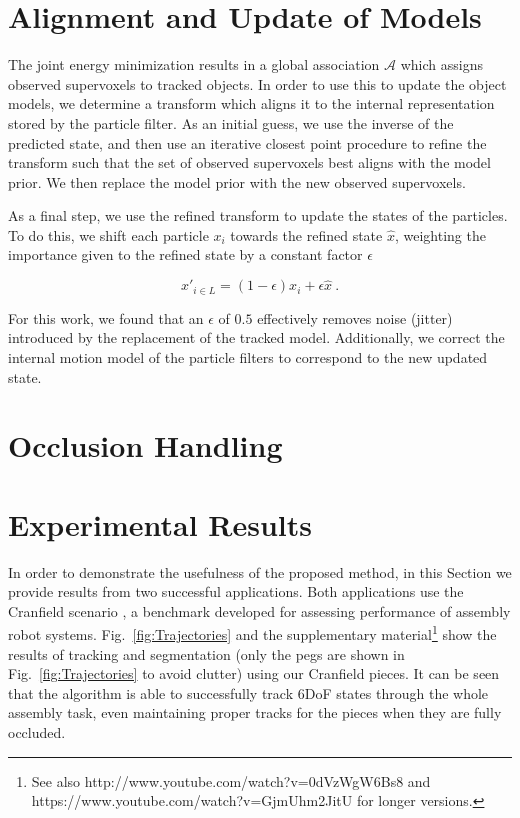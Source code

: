 \section{Alignment and Update of Models}
The joint energy minimization results in a global association $\mathcal{A}$ which assigns observed supervoxels to tracked objects. In order to use this to update the object models, we determine a transform which aligns it to the internal representation stored by the particle filter. As an initial guess, we use the inverse of the predicted state, and then use an iterative closest point \cite{ICPChetverikov} procedure to refine the transform such that the set of observed supervoxels best aligns with the model prior. We then replace the model prior with the new observed supervoxels. 

As a final step, we use the refined transform to update the states of the particles. To do this, we shift each particle $x_i$ towards the refined state $\hat{x}$, weighting the importance given to the refined state by a constant factor $\epsilon$

\begin{equation}
\label{eqn:PFUpdate}
x'_{i \in L} = (1-\epsilon) x_i + \epsilon \hat{x}~.
\end{equation}

For this work, we found that an $\epsilon$ of $0.5$ effectively removes noise (jitter) introduced by the replacement of the tracked model. Additionally, we correct the internal motion model of the particle filters to correspond to the new updated state.

\section{Occlusion Handling}
\section{Experimental Results}
In order to demonstrate the usefulness of the proposed method, in this Section we provide results from two successful applications. Both applications use the Cranfield scenario \cite{collins1984development}, a benchmark developed for assessing performance of assembly robot systems. Fig.~\ref{fig:Trajectories} and the supplementary material\footnote{See also http://www.youtube.com/watch?v=0dVzWgW6Bs8 and https://www.youtube.com/watch?v=GjmUhm2JitU for longer versions.} show the results of tracking and segmentation (only the pegs are shown in Fig.~\ref{fig:Trajectories} to avoid clutter) using our Cranfield pieces. It can be seen that the algorithm is able to successfully track 6DoF states through the whole assembly task, even maintaining proper tracks for the pieces when they are fully occluded.


